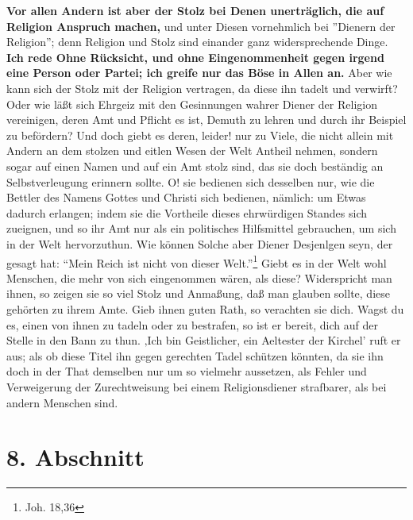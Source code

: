 \textbf{Vor allen Andern ist aber der Stolz bei Denen unerträglich, die auf Religion
Anspruch machen,} und unter Diesen vornehmlich bei ''Dienern der Religion''; denn
Religion und Stolz sind einander ganz widersprechende Dinge. \textbf{Ich rede Ohne
Rücksicht, und ohne Eingenommenheit gegen irgend eine Person oder Partei; ich
greife nur das Böse in Allen an.} Aber wie kann sich der Stolz mit der Religion
vertragen, da diese ihn tadelt und verwirft? Oder wie läßt sich Ehrgeiz mit den
Gesinnungen wahrer Diener der Religion vereinigen, deren Amt und Pflicht es ist,
Demuth zu lehren und durch ihr Beispiel zu befördern? Und doch giebt es deren,
leider! nur zu Viele, die nicht allein mit Andern an dem stolzen und eitlen
Wesen der Welt Antheil nehmen, sondern sogar auf einen Namen und auf ein Amt
stolz sind, das sie doch beständig an Selbstverleugung erinnern sollte. O! sie
bedienen sich desselben nur, wie die Bettler des Namens Gottes und Christi sich
bedienen, nämlich: um Etwas dadurch erlangen; indem sie die Vortheile dieses
ehrwürdigen Standes sich zueignen, und so ihr Amt nur als ein politisches
Hilfsmittel gebrauchen, um sich in der Welt hervorzuthun. Wie können Solche aber
Diener Desjenlgen seyn, der gesagt hat: "`Mein Reich ist nicht von dieser
Welt."'\footnote{Joh. 18,36} Giebt es in der Welt wohl Menschen, die mehr von
sich eingenommen wären, als diese? Widerspricht man ihnen, so zeigen sie so viel
Stolz und Anmaßung, daß man glauben sollte, diese gehörten zu ihrem Amte. Gieb
ihnen guten Rath, so verachten sie dich. Wagst du es, einen von ihnen zu tadeln
oder zu bestrafen, so ist er bereit, dich auf der Stelle in den Bann zu thun.
‚Ich bin Geistlicher, ein Aeltester der Kirchel’ ruft er aus; als ob diese Titel
ihn gegen gerechten Tadel schützen könnten, da sie ihn doch in der That
demselben nur um so vielmehr aussetzen, als Fehler und Verweigerung der
Zurechtweisung bei einem Religionsdiener strafbarer, als bei andern Menschen
sind.

\section{8. Abschnitt} \label{kap12_ab8}

